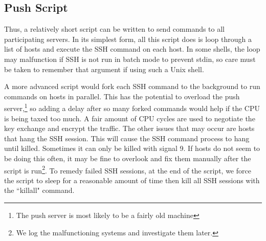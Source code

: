 \subsection{Push Script}
Thus, a relatively short script can be written to send commands to all participating servers.  In its simplest form, all this script does is loop through a list of hosts and execute the SSH command on each host.  In some shells, the loop may malfunction if SSH is not run in batch mode to prevent stdin, so care must be taken to remember that argument if using such a Unix shell.  

A more advanced script would fork each SSH command to the background to run commands on hosts in parallel.  This has the potential to overload the push server,\footnote{The push server is most likely to be a fairly old machine} so adding a delay after so many forked commands would help if the CPU is being taxed too much.  A fair amount of CPU cycles are used to negotiate the key exchange and encrypt the traffic.  The other issues that may occur are hosts that hang the SSH session.  This will cause the SSH command process to hang until killed.  Sometimes it can only be killed with signal 9.  If hosts do not seem to be doing this often, it may be fine to overlook and fix them manually after the script is run\footnote{We log the malfunctioning systems and investigate them later.}.  To remedy failed SSH sessions, at the end of the script, we force the script to sleep for a reasonable amount of time then kill all SSH sessions with the ``killall" command.  

